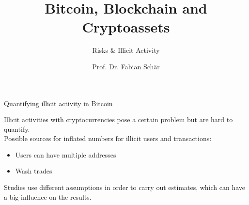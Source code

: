\documentclass[]{beamer}
\title{Bitcoin, Blockchain and Cryptoassets}
\subtitle{Risks \& Illicit Activity}
\author{Prof. Dr. Fabian Schär}
\institute{University of Basel}
\begin{document}
\thispagestyle{empty}
\begin{frame}[noframenumbering]
	\titlepage
\end{frame}

\begin{frame}{Quantifying illicit activity in Bitcoin}

Illicit activities with cryptocurrencies pose a certain problem but are hard to quantify. \\
	\vspace{1em}
	Possible sources for inflated numbers for illicit users and transactions:
		\begin{itemize}
			\item Users can have multiple addresses
			\item Wash trades
		\end{itemize}
	\vspace{1em} 
	
	Studies use different assumptions in order to carry out estimates, which can have a big influence on the results.	
\end{frame}
\end{document}
